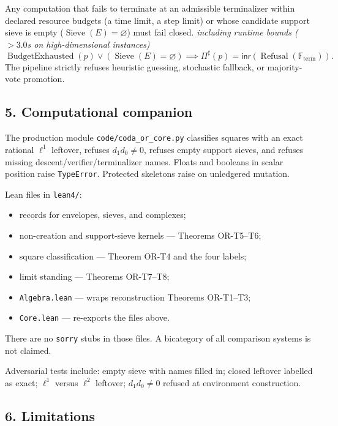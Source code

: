 \documentclass[
  11pt,
]{article}
\providecommand{\tightlist}{%
  \setlength{\itemsep}{0pt}\setlength{\parskip}{0pt}}
\providecommand{\st}[1]{\emph{#1}}
\begin{document}
Any computation that fails to terminate at an admissible terminalizer within declared resource budgets (a time limit, a step limit) or whose candidate support sieve is empty (\(\operatorname{Sieve}(E) = \varnothing\)) must fail closed. \st{including runtime bounds ($> 3.0$s on high-dimensional instances)} \[\operatorname{BudgetExhausted}(p) \lor (\operatorname{Sieve}(E) = \varnothing) \implies \Pi^\sharp(p) = \mathsf{inr}(\operatorname{Refusal}(\mathbb{F}_{\mathrm{term}})).\] The pipeline strictly refuses heuristic guessing, stochastic fallback, or majority-vote promotion.

\subsection{5. Computational companion}\label{computational-companion}

The production module \nolinkurl{code/coda_or_core.py} classifies squares with an exact rational \(\ell^1\) leftover, refuses \(d_1 d_0\neq 0\), refuses empty support sieves, and refuses missing descent/verifier/terminalizer names. Floats and booleans in scalar position raise \texttt{TypeError}. Protected skeletons raise on unledgered mutation.

Lean files in \texttt{lean4/}:

\begin{itemize}
\tightlist
\item
  records for envelopes, sieves, and complexes;
\item
  non-creation and support-sieve kernels --- Theorems OR-T5--T6;
\item
  square classification --- Theorem OR-T4 and the four labels;
\item
  limit standing --- Theorems OR-T7--T8;
\item
  \nolinkurl{Algebra.lean} --- wraps reconstruction Theorems OR-T1--T3;
\item
  \texttt{Core.lean} --- re-exports the files above.
\end{itemize}

There are no \texttt{sorry} stubs in those files. A bicategory of all comparison systems is not claimed.

Adversarial tests include: empty sieve with names filled in; closed leftover labelled as exact; \(\ell^1\) versus \(\ell^2\) leftover; \(d_1 d_0\neq 0\) refused at environment construction.

\subsection{6. Limitations}\label{limitations}
\end{document}
